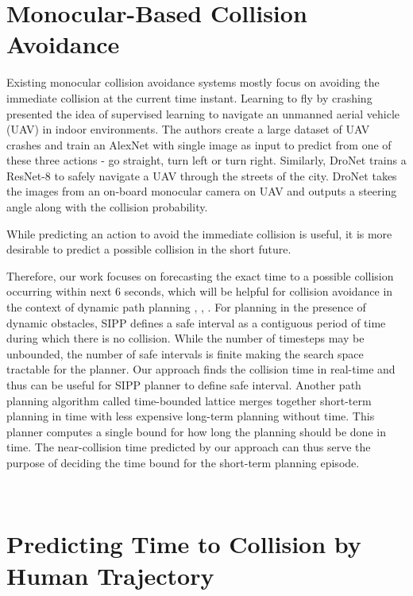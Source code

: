 \noindent
\section{Monocular-Based Collision Avoidance} 

Existing monocular collision avoidance systems mostly focus on avoiding the immediate collision at the current time instant. Learning to fly by crashing \cite{gandhi} presented the idea of supervised learning to navigate an unmanned aerial vehicle (UAV) in indoor environments. The authors create a large dataset of UAV crashes and train an AlexNet \cite{alexnet} with single image as input to predict from one of these three actions - go straight, turn left or turn right. Similarly, DroNet \cite{DroNet} trains a ResNet-8 \cite{resnet} to safely navigate a UAV through the streets of the city.
DroNet takes the images from an on-board monocular camera on UAV and outputs a steering angle along with the collision probability. 

While predicting an action to avoid the immediate collision is useful, it is more desirable to predict a possible collision in the short future.

Therefore, our work focuses on forecasting the exact time to a possible collision occurring within next 6 seconds, which will be helpful for collision avoidance in the context of dynamic path planning \cite{SIPP}, \cite{time-bounded}, \cite{vemula2016path}. For planning in the presence of dynamic obstacles, SIPP \cite{SIPP} defines a safe interval as a contiguous period of time during which there is no collision. While the number of timesteps may be unbounded, the number of safe intervals is finite making the search space tractable for the planner. Our approach finds the collision time in real-time and thus can be useful for SIPP planner to define safe interval. Another path planning algorithm called time-bounded lattice \cite{time-bounded} merges together short-term planning in time with less expensive long-term planning without time. This planner computes a single bound for how long the planning should be done in time. The near-collision time predicted by our approach can thus serve the purpose of deciding the time bound for the short-term planning episode.    

\noindent\\
\section{Predicting Time to Collision by Human Trajectory}

